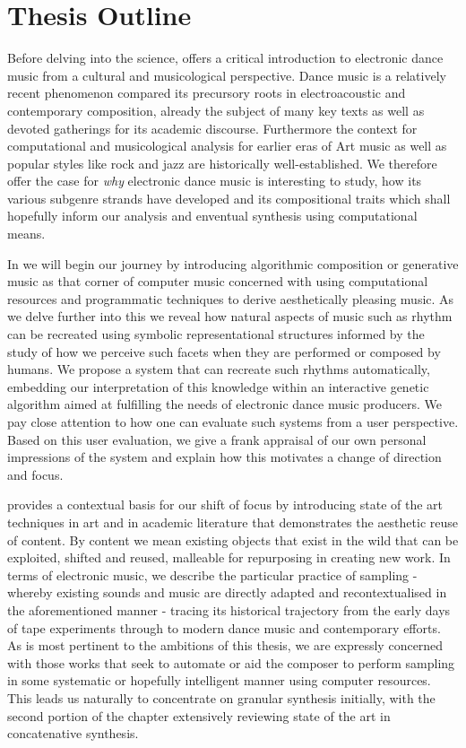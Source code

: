 \section{Thesis Outline}

Before delving into the science,  offers a critical introduction to electronic dance music from a cultural and musicological perspective. Dance music is a relatively recent phenomenon compared its precursory roots in electroacoustic and contemporary composition, already the subject of many key texts as well as devoted gatherings for its academic discourse. Furthermore the context for computational and musicological analysis for earlier eras of Art music as well as popular styles like rock and jazz are historically well-established. We therefore offer the case for \textit{why} electronic dance music is interesting to study, how its various subgenre strands have developed and its compositional traits which shall hopefully inform our analysis and enventual synthesis using computational means. 

In  we will begin our journey by introducing algorithmic composition or generative music as that corner of computer music concerned with using computational resources and programmatic techniques to derive aesthetically pleasing music. As we delve further into this we reveal how natural aspects of music such as rhythm can be recreated using symbolic representational structures informed by the study of how we perceive such facets when they are performed or composed by humans. We propose a system that can recreate such rhythms automatically, embedding our interpretation of this knowledge within an interactive genetic algorithm aimed at fulfilling the needs of electronic dance music producers. We pay close attention to how one can evaluate such systems from a user perspective. Based on this user evaluation, we give a frank appraisal of our own personal impressions of the system and explain how this motivates a change of direction and focus.

 provides a contextual basis for our shift of focus by introducing state of the art techniques in art and in academic literature that demonstrates the aesthetic reuse of content. By content we mean existing objects that exist in the wild that can be exploited, shifted and reused, malleable for repurposing in creating new work. In terms of electronic music, we describe the particular practice of sampling - whereby existing sounds and music are directly adapted and recontextualised in the aforementioned manner - tracing its historical trajectory from the early days of tape experiments through to modern dance music and contemporary efforts. As is most pertinent to the ambitions of this thesis, we are expressly concerned with those works that seek to automate or aid the composer to perform sampling in some systematic or hopefully intelligent manner using computer resources. This leads us naturally to concentrate on granular synthesis initially, with the second portion of the chapter extensively reviewing state of the art in concatenative synthesis.

